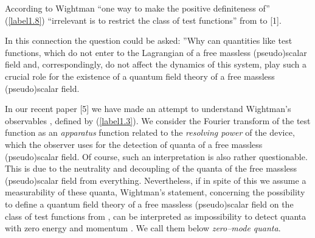 \documentclass[a4paper,12pt] {article}
\begin{document}
According to Wightman ``one way to make the positive definiteness of''
(\ref{label1.8}) ``irrelevant is to restrict the class of test
functions'' from \coordHE{} to \coordHE{} [1].

In this connection the question could be asked: ''Why can quantities
like test functions, which do not enter to the Lagrangian of a free
massless (pseudo)scalar field and, correspondingly, do not affect the
dynamics of this system, play such a crucial role for the existence of
a quantum field theory of a free massless (pseudo)scalar field.

In our recent paper [5] we have made an attempt to understand
Wightman's observables \coordHE{}, defined by (\ref{label1.3}). We
consider the Fourier transform \coordHE{} of the test function
\coordHE{} as an {\it apparatus} function related to the {\it resolving
power} of the device, which the observer uses for the detection of
quanta of a free massless (pseudo)scalar field. Of course, such an
interpretation is also rather questionable. This is due to the
neutrality and decoupling of the quanta of the free massless
(pseudo)scalar field \coordHE{} from everything. Nevertheless, if
in spite of this we assume a measurability of these quanta, Wightman's
statement, concerning the possibility to define a quantum field theory
of a free massless (pseudo)scalar field \coordHE{} on the class of
test functions from \coordHE{}, can be interpreted as
impossibility to detect quanta with zero energy and momentum \coordHE{}. We call them below {\it zero--mode quanta}.
\end{document}
